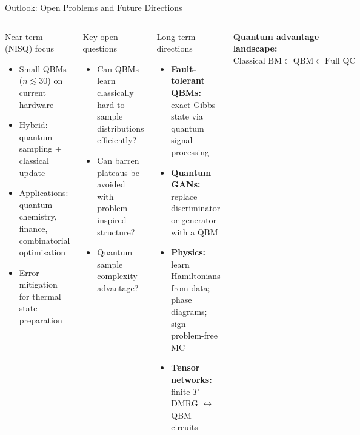 \documentclass[aspectratio=169,10pt]{beamer}
\begin{document}
\begin{frame}{Outlook: Open Problems and Future Directions}
  \begin{columns}[T]
      \begin{block}{Near-term (NISQ) focus}
        \begin{itemize}\small\itemsep0pt
          \item Small QBMs ($n\lesssim 30$) on current hardware
          \item Hybrid: quantum sampling + classical update
          \item Applications: quantum chemistry, finance,
                combinatorial optimisation
          \item Error mitigation for thermal state preparation
        \end{itemize}
      \end{block}
      \vspace{0.05cm}
      \begin{alertblock}{Key open questions}
        \begin{itemize}\small\itemsep0pt
          \item Can QBMs learn classically hard-to-sample
                distributions efficiently?
          \item Can barren plateaus be avoided with
                problem-inspired structure?
          \item Quantum sample complexity advantage?
        \end{itemize}
      \end{alertblock}
      \begin{block}{Long-term directions}
        \begin{itemize}\small\itemsep0pt
          \item \textbf{Fault-tolerant QBMs:} exact Gibbs
                state via quantum signal processing
          \item \textbf{Quantum GANs:} replace discriminator
                or generator with a QBM
          \item \textbf{Physics:} learn Hamiltonians from data;
                phase diagrams; sign-problem-free MC
          \item \textbf{Tensor networks:}
                finite-$T$ DMRG $\leftrightarrow$ QBM circuits
        \end{itemize}
      \end{block}
      \vspace{0.05cm}
      {\small\textbf{Quantum advantage landscape:}\\
      $\text{Classical BM}\subset\text{QBM}\subset\text{Full QC}$}
  \end{columns}
\end{frame}
\end{document}
